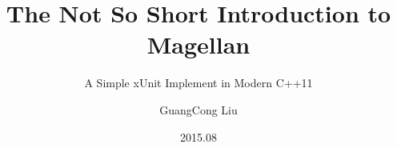 \title[Magellan]
{The Not So Short Introduction to Magellan}

\subtitle{A Simple xUnit Implement in Modern C++11}

\author[Horance Liu]
{ GuangCong Liu
}


\date[2015-08-10]{2015.08}